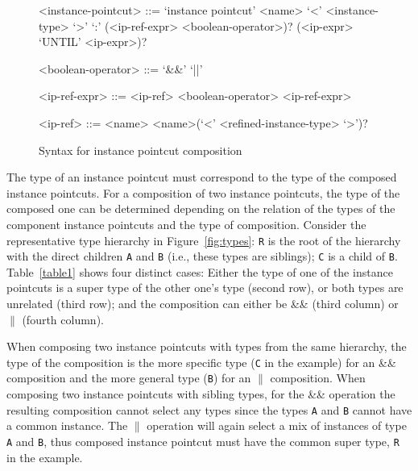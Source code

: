 \documentclass{acm_proc_article-sp}
\begin{document}
\begin{figure}[h]
\begin{grammar}
<instance-pointcut> ::= `instance pointcut' <name> `<' <instance-type> `>' `:'
(<ip-ref-expr> <boolean-operator>)? (<ip-expr> `UNTIL' <ip-expr>)? 

<boolean-operator> ::= `&&' \alt `||'

<ip-ref-expr> ::= <ip-ref>  <boolean-operator> <ip-ref-expr> 

<ip-ref> ::= <name> \alt <name>(`<' <refined-instance-type> `>')?

\end{grammar}
\caption{Syntax for instance pointcut composition}
\label{fig:grammar2}
\end{figure}


The type of an instance pointcut must correspond to the type of the composed instance pointcuts. For a composition of two instance pointcuts, the type of the composed one can be determined depending on the relation of the types of the component instance pointcuts and the type of composition. Consider the representative type hierarchy in Figure~\ref{fig:types}: \texttt{R} is the root of the hierarchy with the direct children \texttt{A} and \texttt{B} (i.e., these types are siblings); \texttt{C} is a child of \texttt{B}. Table~\ref{table1} shows four distinct cases: Either the type of one of the instance pointcuts is a super type of the other one's type (second row), or both types are unrelated (third row); and the composition can either be \&\& (third column) or $\|$ (fourth column).

When composing two instance pointcuts with types from the same hierarchy, the type of the composition is the more specific type (\texttt{C} in the example) for an \&\& composition and the more general type (\texttt{B}) for an $\|$ composition.
When composing two instance pointcuts with sibling types, for the \&\& operation the resulting composition cannot select any types since the types \texttt{A} and \texttt{B} cannot have a common instance. The $\|$ operation will again select a mix of instances of type \texttt{A} and \texttt{B}, thus composed instance pointcut must have the common super type, \texttt{R} in the example.
\end{document}
